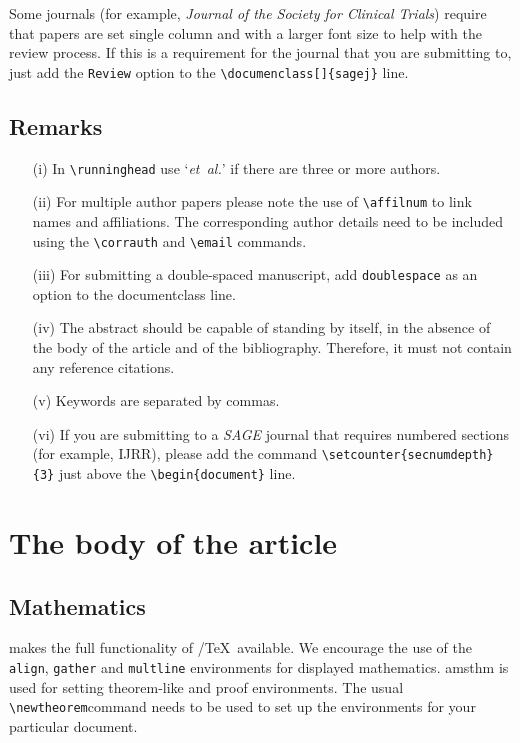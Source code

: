 \documentclass[Afour,sageh,times]{includes/tex/sagej}
\begin{document}
Some journals (for example,
\emph{Journal of the Society for Clinical Trials}) require that papers
are set single column and with a larger font size to help with the
review process. If this is a requirement for the journal that you are
submitting to, just add the \verb+Review+ option to the
\verb+\documenclass[]{sagej}+ line.

\subsection{Remarks}

\begin{enumerate}
  \item[(i)] In \verb"\runninghead" use `\textit{et~al.}' if there are three 
  or more authors.
  \item[(ii)] For multiple author papers please note the use of 
  \verb"\affilnum" to link names and affiliations. The corresponding author 
  details need to be included using the \verb+\corrauth+ and 
  \verb+\email+ commands.
  \item[(iii)] For submitting a double-spaced manuscript, add 
  \verb"doublespace" as an option to the documentclass line.
  \item[(iv)] The abstract should be capable of standing by itself, in the 
  absence of the body of the article and of the bibliography. Therefore, it 
  must not contain any reference citations.
  \item[(v)] Keywords are separated by commas.
  \item[(vi)] If you are submitting to a \textit{SAGE} journal that requires 
  numbered sections (for example, IJRR), please add the command 
  \verb+\setcounter{secnumdepth}{3}+ just above the \verb+\begin{document}+ 
  line.
\end{enumerate}

\section{The body of the article}

\subsection{Mathematics}

\textsf{\journalclass} makes the full functionality of
\AmS/\TeX~available. We encourage the use of the \verb"align",
\verb"gather" and \verb"multline" environments for displayed
mathematics. \textsf{amsthm} is used for setting theorem-like and proof
environments. The usual \verb"\newtheorem"command needs to be used to
set up the environments for your particular document.
\end{document}
